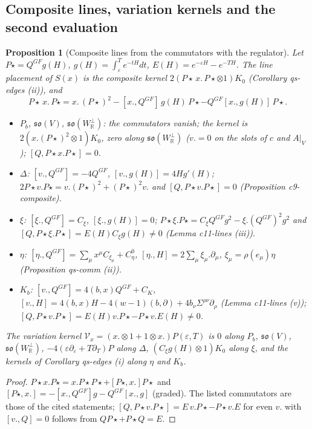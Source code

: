 \documentclass[11pt]{article}
\numberwithin{equation}{section}
\theoremstyle{plain}
\newtheorem{proposition}[theorem]{Proposition}
\theoremstyle{definition}
\newcommand{\AV}{A|_V}
\begin{document}
\subsection{Composite lines, variation kernels and the second evaluation}

\begin{proposition}[Composite lines from the commutators with the regulator]
\label{prop:at-composite}
Let $P\star=Q^{GF}g(H)$, $g(H)=\int_\varepsilon^Te^{-tH}dt$, $E(H)=e^{-\varepsilon H}-e^{-TH}$. The line placement of $S(x)$ is the composite kernel $2(P\star\,x.\,P\star\otimes1)K_0$ (Corollary qs-edges (ii)), and
\[
P\star\,x.\,P\star=x.\,(P\star)^2-[x.,Q^{GF}]\,g(H)\,P\star-Q^{GF}[x.,g(H)]\,P\star .
\]
\begin{itemize}
\item $P_b$, $\mathfrak{so}(V)$, $\mathfrak{so}(W^\perp_{\mathbb R})$: the commutators vanish; the kernel is $2(x.(P\star)^2\otimes1)K_0$, zero along $\mathfrak{so}(W^\perp_{\mathbb R})$ ($v.=0$ on the slots of $c$ and $\AV$); $[Q,P\star x.P\star]=0$.
\item $\Delta$: $[v.,Q^{GF}]=-4Q^{GF}$, $[v.,g(H)]=4Hg'(H)$; $2P\star v.P\star=v.(P\star)^2+(P\star)^2v.$ and $[Q,P\star v.P\star]=0$ (Proposition c9-composite).
\item $\xi$: $[\xi.,Q^{GF}]=C_\xi$, $[\xi.,g(H)]=0$; $P\star\xi.P\star=C_\xi Q^{GF}g^2-\xi.(Q^{GF})^2g^2$ and $[Q,P\star\xi.P\star]=E(H)C_\xi g(H)\ne0$ (Lemma c11-lines (iii)).
\item $\eta$: $[\eta.,Q^{GF}]=\sum_\mu x^\mu C_{\xi_\mu}+C^0_\eta$, $[\eta.,H]=2\sum_\mu\xi_\mu.\partial_\mu$, $\xi_\mu=\rho(e_\mu)\eta$ (Proposition qs-comm (ii)).
\item $K_b$: $[v.,Q^{GF}]=4(b,x)Q^{GF}+C_K$, $[v.,H]=4(b,x)H-4(w-1)(b,\partial)+4b_\nu\Sigma^{\rho\nu}\partial_\rho$ (Lemma c11-lines (v)); $[Q,P\star v.P\star]=E(H)v.P\star-P\star v.E(H)\ne0$.
\end{itemize}
The variation kernel $\mathcal V_x=(x.\otimes1+1\otimes x.)P(\varepsilon,T)$ is $0$ along $P_b$, $\mathfrak{so}(V)$, $\mathfrak{so}(W^\perp_{\mathbb R})$, $-4(\varepsilon\partial_\varepsilon+T\partial_T)P$ along $\Delta$, $(C_\xi g(H)\otimes1)K_0$ along $\xi$, and the kernels of Corollary qs-edges (i) along $\eta$ and $K_b$.
\end{proposition}

\begin{proof}
$P\star x.P\star=x.P\star P\star+[P\star,x.]P\star$ and $[P\star,x.]=-[x.,Q^{GF}]g-Q^{GF}[x.,g]$ (graded). The listed commutators are those of the cited statements; $[Q,P\star v.P\star]=E\,v.P\star-P\star v.E$ for even $v.$ with $[v.,Q]=0$ follows from $QP\star+P\star Q=E$.
\end{proof}
\end{document}
